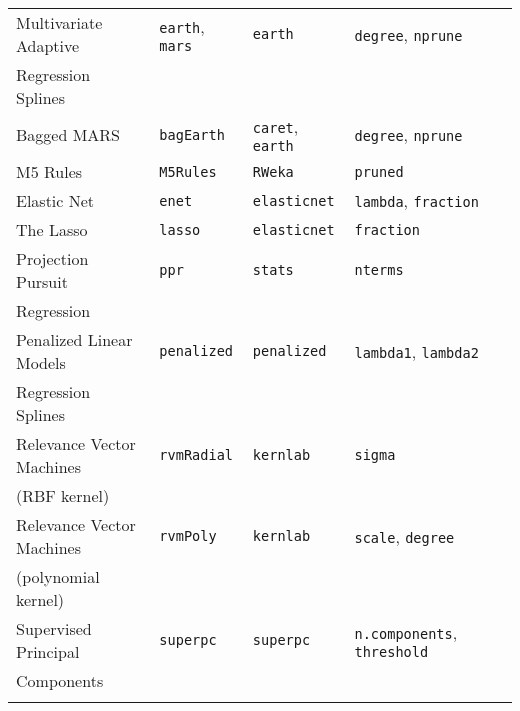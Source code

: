 \documentclass[12pt]{article}
\begin{document}
\begin{longtable}{lllll}
      Multivariate Adaptive  &
         \texttt{earth}, \texttt{mars} & 
            \texttt{earth}       & 
            \texttt{degree}, \texttt{nprune} \\            
      \:\: Regression Splines & & &\\
            
      Bagged MARS &
         \texttt{bagEarth} & 
            \texttt{caret},  \texttt{earth}      & 
            \texttt{degree}, \texttt{nprune} \\    
            
      M5 Rules &
         \texttt{M5Rules} & 
            \texttt{RWeka}    & 
            \texttt{pruned}  \\             
      
      Elastic Net &
         \texttt{enet} & 
            \texttt{elasticnet}      & 
            \texttt{lambda}, \texttt{fraction} \\          

      The Lasso &
         \texttt{lasso} & 
            \texttt{elasticnet}      & 
            \texttt{fraction} \\       

      Projection Pursuit   &
         \texttt{ppr} & 
            \texttt{stats}       & 
            \texttt{nterms} \\            
      \:\: Regression & & &\\                   
            
      Penalized Linear Models  &
         \texttt{penalized} & 
            \texttt{penalized}       & 
            \texttt{lambda1}, \texttt{lambda2} \\            
      \:\: Regression Splines & & &\\
      
      Relevance Vector Machines  &
         \texttt{rvmRadial} & 
            \texttt{kernlab}       & 
            \texttt{sigma} \\            
      \:\: (RBF kernel) & & &\\   
      
      Relevance Vector Machines  &
         \texttt{rvmPoly} & 
            \texttt{kernlab}       & 
            \texttt{scale}, \texttt{degree} \\            
      \:\: (polynomial kernel) & & &\\               

      Supervised Principal &
         \texttt{superpc}  &
         \texttt{superpc}  &
         \texttt{n.components}, 
         \texttt{threshold} \\
      \:\: Components  & & &\\
      \\       
             

\end{longtable}
\end{document}
